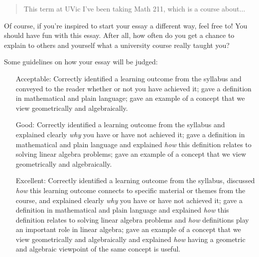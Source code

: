 \documentclass[letter]{article}
\begin{document}
\begin{enumerate}
\begin{quote}
				This term at UVic I've been taking Math 211, which is a course about$\ldots$
			\end{quote}

			Of course, if you're inspired to start your essay a different way, feel free to!
			You should have fun with this essay.  After all, how often do you get a chance to explain 
			to others and yourself what a university course really taught you?

			Some guidelines on how your essay will be judged:
			\begin{enumerate}
				\item[Acceptable:]
					Correctly identified a learning outcome from the syllabus 
					and conveyed to the reader whether or not you have achieved it; gave a definition in mathematical
					and plain language; gave an example of a concept that we view geometrically and algebraically.
				\item[Good:]
					Correctly identified a learning outcome from the syllabus
					and explained clearly \emph{why} you have or have not achieved it; gave a definition in mathematical
					and plain language and explained \emph{how}
					this definition relates to solving linear algebra problems; 
					gave an example of a concept that we view geometrically and algebraically.
				\item[Excellent:]
					Correctly identified a learning outcome from the syllabus, 
					discussed \emph{how} this learning outcome connects to specific material or themes from the course, 
					and explained clearly \emph{why} you have or have not achieved it;  gave a definition in mathematical
					and plain language and explained \emph{how}
					this definition relates to solving linear algebra problems and \emph{how} definitions play an
					important role in linear algebra; gave an example of a concept that we view geometrically and algebraically
					and explained \emph{how} having a geometric and algebraic viewpoint of the same concept
					is useful.
			\end{enumerate}


	\end{enumerate}
\end{document}

